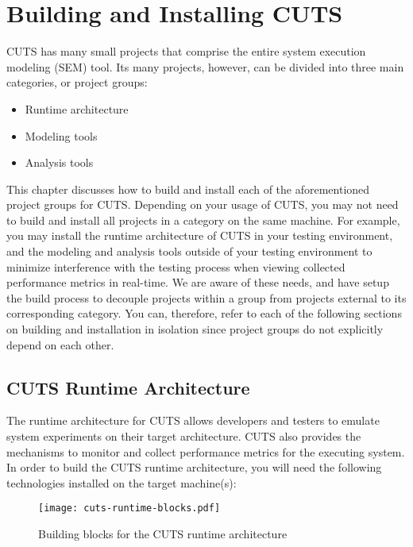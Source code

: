 
\chapter{Building and Installing CUTS}
\label{chap:install}

CUTS has many small projects that comprise the entire system execution modeling
(SEM) tool. Its many projects, however, can be divided into three main categories, or
project groups:
\begin{itemize}
  \item Runtime architecture
  \item Modeling tools
  \item Analysis tools
\end{itemize}
This chapter discusses how to build and install each of the aforementioned
project groups for CUTS. Depending on your usage of CUTS, you may not need to build 
and install all projects in a category on the same machine. For example, you may install the 
runtime architecture of CUTS in your testing environment, and the modeling and analysis
tools outside of your testing environment to minimize interference with the testing 
process when viewing collected performance metrics in real-time. We are aware of 
these needs, and have setup the build process to decouple projects within a group from 
projects external to its corresponding category. You can, therefore, refer to each of the 
following sections on building and installation in isolation since project groups do 
not explicitly depend on each other.

\section{CUTS Runtime Architecture}
\label{sec:install-runtime}

The runtime architecture for CUTS allows developers and testers to emulate system 
experiments on their target architecture. CUTS also provides the mechanisms
to monitor and collect performance metrics for the executing system. In order to 
build the CUTS runtime architecture, you will need the following technologies 
installed on the target machine(s):
\begin{figure}[htbp]
  \centering
  \texttt{[image: cuts-runtime-blocks.pdf]}
  \caption{Building blocks for the CUTS runtime architecture}
  \label{fig:cuts-runtime-blocks}
\end{figure}

